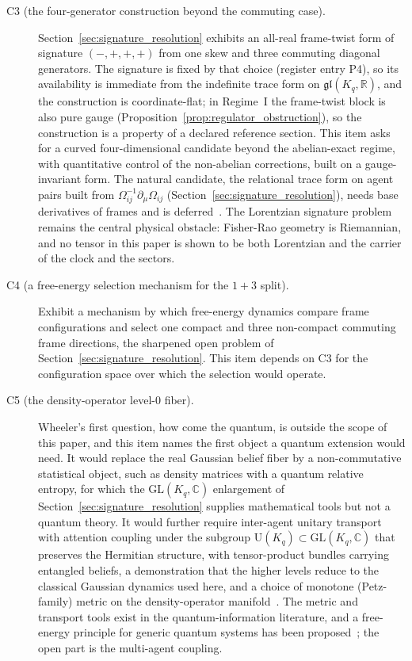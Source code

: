 \documentclass[11pt]{article}
\begin{document}
\begin{description}
\item[C3 (the four-generator construction beyond the commuting case).] Section~\ref{sec:signature_resolution} exhibits an all-real frame-twist form of signature $(-,+,+,+)$ from one skew and three commuting diagonal generators. The signature is fixed by that choice (register entry P4), so its availability is immediate from the indefinite trace form on $\mathfrak{gl}(K_q, \mathbb{R})$, and the construction is coordinate-flat; in Regime~I the frame-twist block is also pure gauge (Proposition~\ref{prop:regulator_obstruction}), so the construction is a property of a declared reference section. This item asks for a curved four-dimensional candidate beyond the abelian-exact regime, with quantitative control of the non-abelian corrections, built on a gauge-invariant form. The natural candidate, the relational trace form on agent pairs built from $\Omega_{ij}^{-1}\partial_\mu\Omega_{ij}$ (Section~\ref{sec:signature_resolution}), needs base derivatives of frames and is deferred~\cite{DennisGaugeVFESuppB2026}. The Lorentzian signature problem remains the central physical obstacle: Fisher-Rao geometry is Riemannian, and no tensor in this paper is shown to be both Lorentzian and the carrier of the clock and the sectors.
\item[C4 (a free-energy selection mechanism for the $1{+}3$ split).] Exhibit a mechanism by which free-energy dynamics compare frame configurations and select one compact and three non-compact commuting frame directions, the sharpened open problem of Section~\ref{sec:signature_resolution}. This item depends on C3 for the configuration space over which the selection would operate.
\item[C5 (the density-operator level-0 fiber).] Wheeler's first question, how come the quantum, is outside the scope of this paper, and this item names the first object a quantum extension would need. It would replace the real Gaussian belief fiber by a non-commutative statistical object, such as density matrices with a quantum relative entropy, for which the $\mathrm{GL}(K_q, \mathbb{C})$ enlargement of Section~\ref{sec:signature_resolution} supplies mathematical tools but not a quantum theory. It would further require inter-agent unitary transport with attention coupling under the subgroup $\mathrm{U}(K_q) \subset \mathrm{GL}(K_q, \mathbb{C})$ that preserves the Hermitian structure, with tensor-product bundles carrying entangled beliefs, a demonstration that the higher levels reduce to the classical Gaussian dynamics used here, and a choice of monotone (Petz-family) metric on the density-operator manifold~\cite{Petz1996}. The metric and transport tools exist in the quantum-information literature, and a free-energy principle for generic quantum systems has been proposed~\cite{Fields2022}; the open part is the multi-agent coupling.

\end{description}
\end{document}
